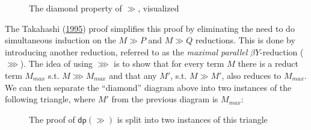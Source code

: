 \documentclass[a4paper, 12pt, twoside]{style/ociamthesis}
\theoremstyle{plain}
\theoremstyle{definition}
\theoremstyle{remark}
\newcommand{\dip}{\textsf{dp}}
\begin{document}
\begin{figure}[h]
\begin{center}
\end{center}
\caption{The diamond property of $\gg$, visualized}
\end{figure}

The Takahashi (\protect\hyperlink{ref-takahashi95}{1995}) proof
simplifies this proof by eliminating the need to do simultaneous
induction on the \(M \gg P\) and \(M \gg Q\) reductions. This is done by
introducing another reduction, referred to as the \emph{maximal
parallel} \(\beta Y\)-reduction (\(\ggg\)). The idea of using \(\ggg\)
is to show that for every term \(M\) there is a reduct term \(M_{max}\)
s.t. \(M \ggg M_{max}\) and that any \(M'\), s.t. \(M \gg M'\), also
reduces to \(M_{max}\). We can then separate the ``diamond'' diagram
above into two instances of the following triangle, where \(M'\) from
the previous diagram is \(M_{max}\):

\begin{figure}[h]
\begin{center}
\end{center}
\caption{The proof of $\dip(\gg)$ is split into two instances of this triangle}
\label{figure:gggTriangle}
\end{figure}
\end{document}
